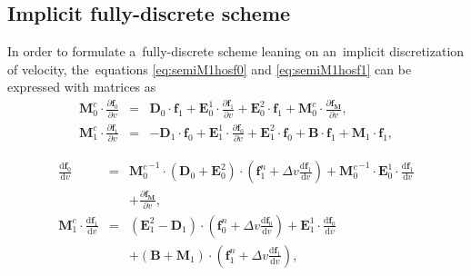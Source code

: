 \documentclass[review]{elsarticle}
\newcommand{\pdv}[2]{\frac{\partial{#1}}{\partial{#2}}}
\newcommand{\vect}[1]{\boldsymbol{#1}}
\newcommand{\matr}[1]{\mathbf{#1}}
\newcommand{\dI}{\text{d}}
\newcommand{\odv}[2]{\frac{\dI #1}{\dI #2}}
\newcommand{\ddv}[2]{\odv{#1}{#2}}
\newcommand{\vmag}{v}
\newcommand{\fM}{f_M}
\newcommand{\vfzero}{\vect{f}_0}
\newcommand{\fone}{\vect{f}_1}
\begin{document}
\subsection{Implicit fully-discrete scheme}\label{sec:impl_fullydiscrete_scheme}
In order to formulate a~fully-discrete scheme leaning on an~implicit 
discretization of velocity, the~equations \eqref{eq:semiM1hosf0} and 
\eqref{eq:semiM1hosf1} can be expressed with matrices as
\begin{eqnarray}
  \matr{M}^c_0 \cdot \pdv{\vfzero}{\vmag}  
  &=& 
  \matr{D}_0 \cdot \fone
  + \matr{E}_0^1 \cdot \pdv{\fone}{\vmag} + \matr{E}_0^2 \cdot \fone
  + \matr{M}^c_0 \cdot \pdv{\vect{\fM}}{\vmag} ,  
  \nonumber\\
  \matr{M}^c_1 \cdot \pdv{\fone}{\vmag}  
  &=& 
  - \matr{D}_1 \cdot \vfzero 
  + \matr{E}_1^1 \cdot \pdv{\vfzero}{\vmag}
  + \matr{E}_1^2 \cdot \vfzero
  + \matr{B} \cdot \fone
  + \matr{M}_1 \cdot \fone ,
  \nonumber
\end{eqnarray}

\begin{eqnarray}
  \ddv{\vfzero}{\vmag}  
  &=& 
  {\matr{M}^c_0}^{-1} \cdot \left(\matr{D}_0 + \matr{E}_0^2 \right) 
  \cdot \left(\fone^n + \Delta \vmag \ddv{\fone}{\vmag} \right)
  + {\matr{M}^c_0}^{-1} \cdot \matr{E}_0^1 \cdot \ddv{\fone}{\vmag} \nonumber\\
  && + \pdv{\vect{\fM}}{\vmag} ,  
  \nonumber\\
  \matr{M}^c_1 \cdot \ddv{\fone}{\vmag}  
  &=& 
  \left( \matr{E}_1^2 - \matr{D}_1 \right) 
  \cdot \left(\vfzero^n + \Delta\vmag \ddv{\vfzero}{\vmag} \right) 
  + \matr{E}_1^1 \cdot \ddv{\vfzero}{\vmag} \nonumber\\
  && + \left( \matr{B} + \matr{M}_1 \right)  
  \cdot \left(\fone^n + \Delta \vmag \ddv{\fone}{\vmag} \right) ,
  \nonumber
\end{eqnarray}

\end{document}
